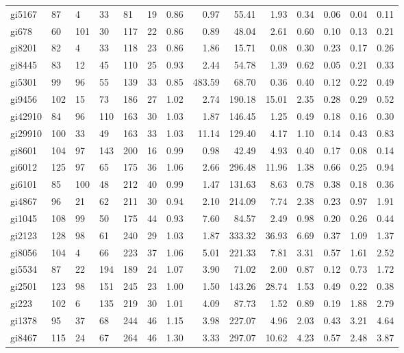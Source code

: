 \documentclass[runningheads]{llncs}
\begin{document}
{\begin{longtable}{l lllll rrrr rrrr }
gi5167 & 87 & 4 & 33 & 81 & 19 & 0.86 & 0.97 & 55.41 & 1.93 & 0.34 & 0.06 & 0.04 & 0.11 \\
gi678 & 60 & 101 & 30 & 117 & 22 & 0.86 & 0.89 & 48.04 & 2.61 & 0.60 & 0.10 & 0.13 & 0.21 \\
gi8201 & 82 & 4 & 33 & 118 & 23 & 0.86 & 1.86 & 15.71 & 0.08 & 0.30 & 0.23 & 0.17 & 0.26 \\
gi8445 & 83 & 12 & 45 & 110 & 25 & 0.93 & 2.44 & 54.78 & 1.39 & 0.62 & 0.05 & 0.21 & 0.33 \\
gi5301 & 99 & 96 & 55 & 139 & 33 & 0.85 & 483.59 & 68.70 & 0.36 & 0.40 & 0.12 & 0.22 & 0.49 \\
gi9456 & 102 & 15 & 73 & 186 & 27 & 1.02 & 2.74 & 190.18 & 15.01 & 2.35 & 0.28 & 0.29 & 0.52 \\
gi42910 & 84 & 96 & 110 & 163 & 30 & 1.03 & 1.87 & 146.45 & 1.25 & 0.49 & 0.18 & 0.16 & 0.30 \\
gi29910 & 100 & 33 & 49 & 163 & 33 & 1.03 & 11.14 & 129.40 & 4.17 & 1.10 & 0.14 & 0.43 & 0.83 \\
gi8601 & 104 & 97 & 143 & 200 & 16 & 0.99 & 0.98 & 42.49 & 4.93 & 0.40 & 0.17 & 0.08 & 0.14 \\
gi6012 & 125 & 97 & 65 & 175 & 36 & 1.06 & 2.66 & 296.48 & 11.96 & 1.38 & 0.66 & 0.25 & 0.94 \\
gi6101 & 85 & 100 & 48 & 212 & 40 & 0.99 & 1.47 & 131.63 & 8.63 & 0.78 & 0.38 & 0.18 & 0.36 \\
gi4867 & 96 & 21 & 62 & 211 & 30 & 0.94 & 2.10 & 214.09 & 7.74 & 2.38 & 0.23 & 0.97 & 1.91 \\
gi1045 & 108 & 99 & 50 & 175 & 44 & 0.93 & 7.60 & 84.57 & 2.49 & 0.98 & 0.20 & 0.26 & 0.44 \\
gi2123 & 128 & 98 & 61 & 240 & 29 & 1.03 & 1.87 & 333.32 & 36.93 & 6.69 & 0.37 & 1.09 & 1.37 \\
gi8056 & 104 & 4 & 66 & 223 & 37 & 1.06 & 5.01 & 221.33 & 7.81 & 3.31 & 0.57 & 1.61 & 2.52 \\
gi5534 & 87 & 22 & 194 & 189 & 24 & 1.07 & 3.90 & 71.02 & 2.00 & 0.87 & 0.12 & 0.73 & 1.72 \\
gi2501 & 123 & 98 & 151 & 245 & 23 & 1.00 & 1.50 & 143.26 & 28.74 & 1.53 & 0.49 & 0.22 & 0.38 \\
gi223 & 102 & 6 & 135 & 219 & 30 & 1.01 & 4.09 & 87.73 & 1.52 & 0.89 & 0.19 & 1.88 & 2.79 \\
gi1378 & 95 & 37 & 68 & 244 & 46 & 1.15 & 3.98 & 227.07 & 4.96 & 2.03 & 0.43 & 3.21 & 4.64 \\
gi8467 & 115 & 24 & 67 & 264 & 46 & 1.30 & 3.33 & 297.07 & 10.62 & 4.23 & 0.57 & 2.48 & 3.87 \\

\end{longtable}}
\end{document}
